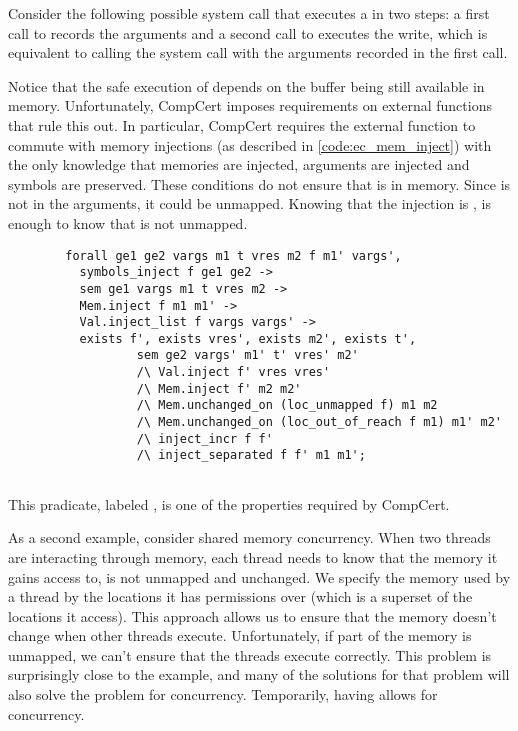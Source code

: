 Consider the following possible system call that executes a  in two steps: a first call to  records the arguments and a second call to  executes the write, which is equivalent to calling the  system call with the arguments recorded in the first call. 

Notice that  the safe execution of  depends on the buffer  being still available in memory. Unfortunately, CompCert imposes requirements on external functions that rule this out. In particular, CompCert requires the external function to commute with memory injections (as described in \ref{code:ec_mem_inject}) with the only knowledge that memories are injected, arguments are injected and symbols are preserved. These conditions do not ensure that  is in memory. Since  is not in the arguments, it could be unmapped. Knowing that the injection is , is enough to know that  is not unmapped. 

\begin{table}\label{code:ec_mem_inject}\centering
\begin{lstlisting}
        forall ge1 ge2 vargs m1 t vres m2 f m1' vargs',
          symbols_inject f ge1 ge2 ->
          sem ge1 vargs m1 t vres m2 ->
          Mem.inject f m1 m1' ->
          Val.inject_list f vargs vargs' ->
          exists f', exists vres', exists m2', exists t',
                  sem ge2 vargs' m1' t' vres' m2'
                  /\ Val.inject f' vres vres'
                  /\ Mem.inject f' m2 m2'
                  /\ Mem.unchanged_on (loc_unmapped f) m1 m2
                  /\ Mem.unchanged_on (loc_out_of_reach f m1) m1' m2'
                  /\ inject_incr f f'
                  /\ inject_separated f f' m1 m1';
    
\end{lstlisting}
\caption{This pradicate, labeled , is one of the properties required by CompCert.}
\end{table}

As a second example, consider shared memory concurrency. When two threads are interacting through memory, each thread needs to know that the memory it gains access to, is not unmapped and unchanged. We specify the memory used by a thread by the locations it has permissions over (which is a superset of the locations it access). This approach allows us to ensure that the memory doesn't change when other threads execute. Unfortunately, if part of the memory is unmapped, we can't ensure that the threads execute correctly. This problem is surprisingly close to the   example, and many of the solutions for that problem will also solve the problem for concurrency. Temporarily, having  allows for concurrency.